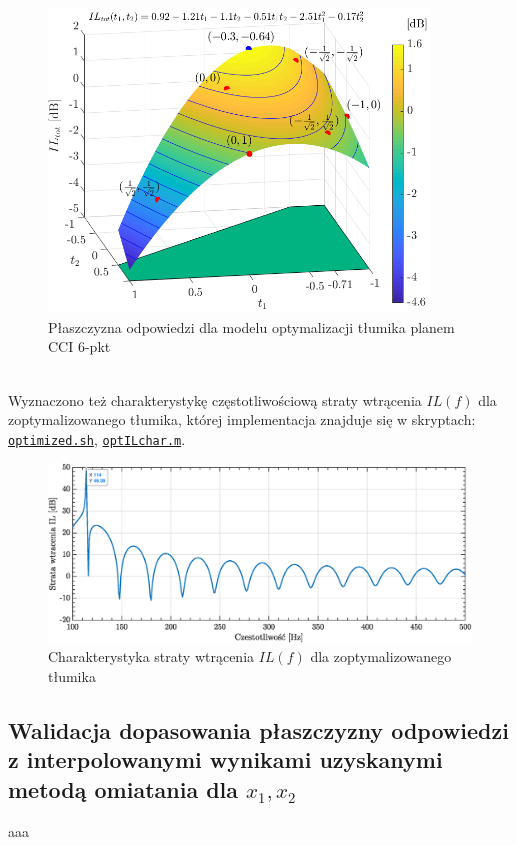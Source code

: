 \documentclass{sprawozdanie-agh}
\begin{document}
\begin{figure}[htbp!]
\centering
\includegraphics[width=0.9\textwidth]{surf_plot.png}
\caption{\vspace{-0.3cm}Płaszczyzna odpowiedzi dla modelu optymalizacji tłumika planem CCI 6-pkt}
\label{plane}
\end{figure}
\\ \newline Wyznaczono też charakterystykę częstotliwościową straty wtrącenia $IL(f)$ dla zoptymalizowanego tłumika, której implementacja znajduje się w skryptach: \hyperref[list9]{\texttt{optimized.sh}}, \hyperref[list10]{\texttt{optILchar.m}}.
\vspace{-0.2cm}
\begin{figure}[htbp!]
    \centering
    \includegraphics[width=\textwidth]{charIL.eps}
    \caption{Charakterystyka straty wtrącenia $IL(f)$ dla zoptymalizowanego tłumika}
    \label{wykres2}
\end{figure}
\newpage
\subsection{Walidacja dopasowania płaszczyzny odpowiedzi z interpolowanymi wynikami uzyskanymi metodą omiatania dla $x_1,x_2$}
\par aaa
\end{document}
